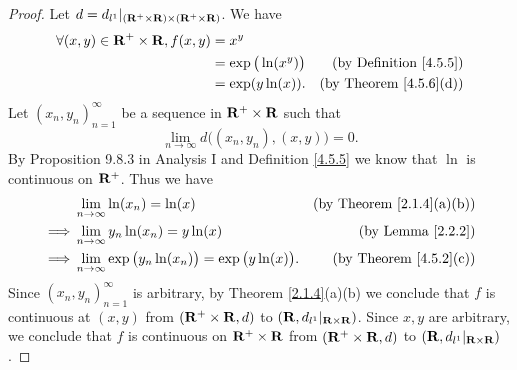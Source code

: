\begin{proof}
    Let \(d = d_{l^1}|_{(\mathbf{R}^+ \times \mathbf{R}) \times (\mathbf{R}^+ \times \mathbf{R})}\).
    We have
    \begin{align*}
        \forall (x, y) \in \mathbf{R}^+ \times \mathbf{R}, f(x, y) & = x^y                                                         \\
                                                   & = \exp\big(\ln(x^y)\big) & \text{(by Definition \ref{4.5.5})} \\
                                                   & = \exp(y \ln(x)).        & \text{(by Theorem \ref{4.5.6}(d))}
    \end{align*}
    Let \((x_n, y_n)_{n = 1}^\infty\) be a sequence in \(\mathbf{R}^+ \times \mathbf{R}\) such that
    \[
        \lim_{n \to \infty} d\big((x_n, y_n), (x, y)\big) = 0.
    \]
    By Proposition 9.8.3 in Analysis I and Definition \ref{4.5.5} we know that \(\ln\) is continuous on \(\mathbf{R}^+\).
    Thus we have
    \begin{align*}
                 & \lim_{n \to \infty} \ln(x_n) = \ln(x)                                    & \text{(by Theorem \ref{2.1.4}(a)(b))} \\
        \implies & \lim_{n \to \infty} y_n \ln(x_n) = y \ln(x)                              & \text{(by Lemma \ref{2.2.2})}         \\
        \implies & \lim_{n \to \infty} \exp\big(y_n \ln(x_n)\big) = \exp\big(y \ln(x)\big). & \text{(by Theorem \ref{4.5.2}(c))}
    \end{align*}
    Since \((x_n, y_n)_{n = 1}^\infty\) is arbitrary, by Theorem \ref{2.1.4}(a)(b) we conclude that \(f\) is continuous at \((x, y)\) from \((\mathbf{R}^+ \times \mathbf{R}, d)\) to \((\mathbf{R}, d_{l^1}|_{\mathbf{R} \times \mathbf{R}})\).
    Since \(x, y\) are arbitrary, we conclude that \(f\) is continuous on \(\mathbf{R}^+ \times \mathbf{R}\) from \((\mathbf{R}^+ \times \mathbf{R}, d)\) to \((\mathbf{R}, d_{l^1}|_{\mathbf{R} \times \mathbf{R}})\).
\end{proof}